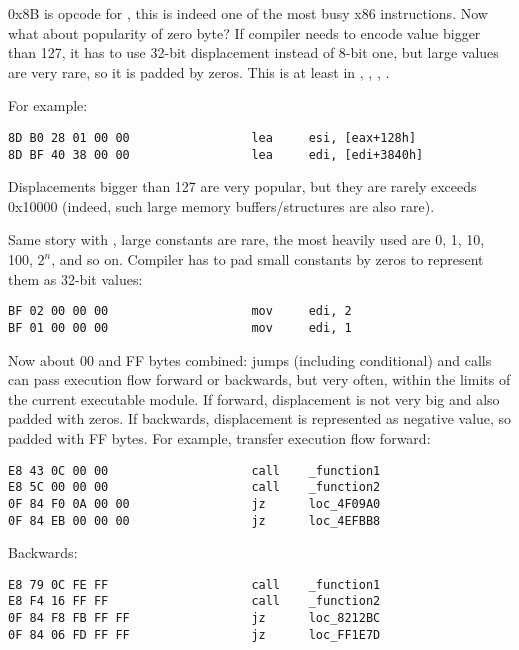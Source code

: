 0x8B is opcode for , this is indeed one of the most busy x86 instructions.
Now what about popularity of zero byte?
If compiler needs to encode value bigger than 127, it has to use 32-bit displacement instead of 8-bit one, but large values are very rare,
so it is padded by zeros.
This is at least in , , , .

For example:

\begin{lstlisting}[style=customasmx86]
8D B0 28 01 00 00                 lea     esi, [eax+128h]
8D BF 40 38 00 00                 lea     edi, [edi+3840h]
\end{lstlisting}

Displacements bigger than 127 are very popular, but they are rarely exceeds 0x10000
(indeed, such large memory buffers/structures are also rare).

Same story with , large constants are rare, the most heavily used are 0, 1, 10, 100, $2^n$, and so on.
Compiler has to pad small constants by zeros to represent them as 32-bit values:

\begin{lstlisting}[style=customasmx86]
BF 02 00 00 00                    mov     edi, 2
BF 01 00 00 00                    mov     edi, 1
\end{lstlisting}

Now about 00 and FF bytes combined: jumps (including conditional) and calls can pass execution flow forward or backwards, but very often,
within the limits of the current executable module.
If forward, displacement is not very big and also padded with zeros.
If backwards, displacement is represented as negative value, so padded with FF bytes.
For example, transfer execution flow forward:

\begin{lstlisting}[style=customasmx86]
E8 43 0C 00 00                    call    _function1
E8 5C 00 00 00                    call    _function2
0F 84 F0 0A 00 00                 jz      loc_4F09A0
0F 84 EB 00 00 00                 jz      loc_4EFBB8
\end{lstlisting}

Backwards:

\begin{lstlisting}[style=customasmx86]
E8 79 0C FE FF                    call    _function1
E8 F4 16 FF FF                    call    _function2
0F 84 F8 FB FF FF                 jz      loc_8212BC
0F 84 06 FD FF FF                 jz      loc_FF1E7D
\end{lstlisting}

